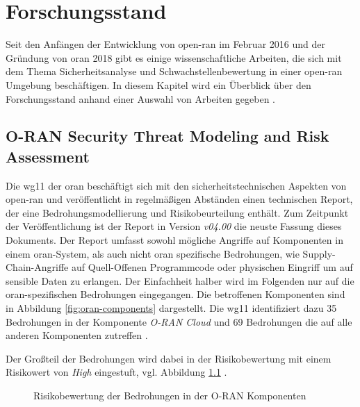 \chapter{Forschungsstand}
\label{chap:forschungsstand}
Seit den Anfängen der Entwicklung von \gls{open-ran} im Februar 2016 und der Gründung von \gls{oran} 2018 gibt es einige wissenschaftliche Arbeiten, die sich mit dem Thema Sicherheitsanalyse und Schwachstellenbewertung in einer \gls{open-ran} Umgebung beschäftigen. In diesem Kapitel wird ein Überblick über den Forschungsstand anhand einer Auswahl von Arbeiten gegeben \cite{Us} \autocite{GuideOpenRAN}.
\section{O-RAN Security Threat Modeling and Risk Assessment}
Die \gls{wg11} der \gls{oran} beschäftigt sich mit den sicherheitstechnischen Aspekten von \gls{open-ran} und veröffentlicht in regelmäßigen Abständen einen technischen Report, der eine Bedrohungsmodellierung und Risikobeurteilung enthält.
Zum Zeitpunkt der Veröffentlichung ist der Report in Version \textit{\textsf{v04.00}} die neuste Fassung dieses Dokuments.
Der Report umfasst sowohl mögliche Angriffe auf Komponenten in einem \gls{oran}-System, als auch nicht \gls{oran} spezifische Bedrohungen, wie Supply-Chain-Angriffe auf Quell-Offenen Programmcode oder physischen Eingriff um auf sensible Daten zu erlangen\autocite{o-ranworkgroup11securityworkgroupORANSecurityThreat2024}.
Der Einfachheit halber wird im Folgenden nur auf die \gls{oran}-spezifischen Bedrohungen eingegangen. Die betroffenen Komponenten sind in Abbildung \ref{fig:oran-components} dargestellt.
Die \gls{wg11} identifiziert dazu 35 Bedrohungen in der Komponente \textit{O-RAN Cloud} und 69 Bedrohungen die auf alle anderen Komponenten zutreffen \autocite[Seite 31 - 69]{o-ranworkgroup11securityworkgroupORANSecurityThreat2024}.

Der Großteil der Bedrohungen wird dabei in der Risikobewertung mit einem Risikowert von \textit{High} eingestuft, vgl. Abbildung \ref{fig:riskscore-oran-components} \autocite[Seite 130 - 164]{o-ranworkgroup11securityworkgroupORANSecurityThreat2024}.

\begin{figure}
    \centering
    \label{fig:riskscore-oran-components}
    \caption{Risikobewertung der Bedrohungen in der O-RAN Komponenten}
\end{figure}



